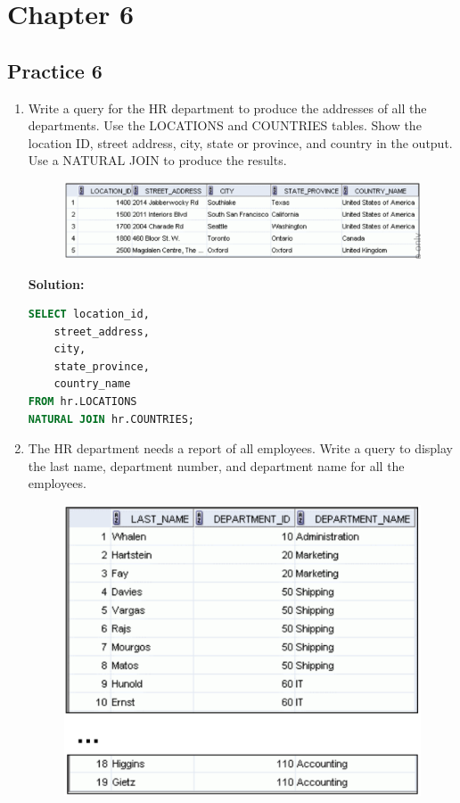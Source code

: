 \documentclass[a4paper,12pt]{article}
\begin{document}


\newpage
\section*{Chapter 6}
\subsection*{Practice 6}
\begin{enumerate}
    \item Write a query for the HR department to produce the addresses of all the departments. Use the
LOCATIONS and COUNTRIES tables. Show the location ID, street address, city, state or
province, and country in the output. Use a NATURAL JOIN to produce the results.

    \begin{figure}[h]
        \centering
            \centering
            \includegraphics[width=.7\linewidth]{graphics/61.png}
    \end{figure}
    
    \textbf{Solution: }
    \begin{lstlisting}[language=SQL]
SELECT location_id,
    street_address,
    city,
    state_province,
    country_name
FROM hr.LOCATIONS
NATURAL JOIN hr.COUNTRIES;
    \end{lstlisting}
        \item The HR department needs a report of all employees. Write a query to display the last name,
department number, and department name for all the employees.
    \begin{figure}[h]
        \centering
            \centering
            \includegraphics[width=.5\linewidth]{graphics/62.png}
    \end{figure}
    

\end{enumerate}
\end{document}
